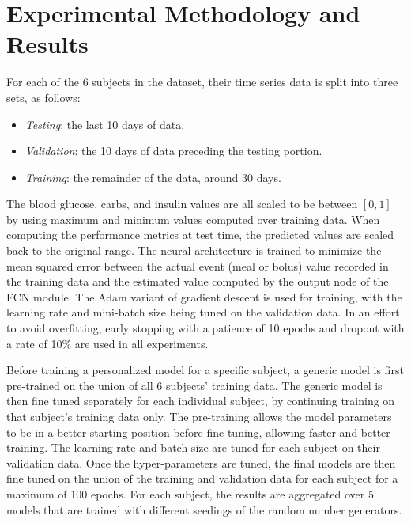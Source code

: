 \documentclass[graybox]{svmult}
\begin{document}
\section{Experimental Methodology and Results}
\label{sec:evaluation}

For each of the 6 subjects in the dataset, their time series data is split into three sets, as follows:
\begin{itemize}
    \item {\it Testing}: the last 10 days of data.
    \item {\it Validation}: the 10 days of data preceding the testing portion.
    \item {\it Training}: the remainder of the data, around 30 days.
\end{itemize}
The blood glucose, carbs, and insulin values are all scaled to be between $[0, 1]$ by using maximum and minimum values computed over training data. When computing the performance metrics at test time, the predicted values are scaled back to the original range.
The neural architecture is trained to minimize the mean squared error between the actual event (meal or bolus) value recorded in the training data and the estimated value computed by the output node of the FCN module. The Adam \cite{kingma:adam} variant of gradient descent is used for training, with the learning rate and mini-batch size being tuned on the validation data. In an effort to avoid overfitting, early stopping with a patience of 10 epochs and dropout with a rate of 10\% are used in all experiments.

Before training a personalized model for a specific subject, a generic model is first pre-trained on the union of all 6 subjects' training data. The generic model is then fine tuned separately for each individual subject, by continuing training on that subject's training data only. The pre-training allows the model parameters to be in a better starting position before fine tuning, allowing faster and better training. The learning rate and batch size are tuned for each subject on their validation data. Once the hyper-parameters are tuned, the final models are then fine tuned on the union of the training and validation data for each subject for a maximum of 100 epochs. For each subject, the results are aggregated over 5 models that are trained with different seedings of the random number generators.
\end{document}
